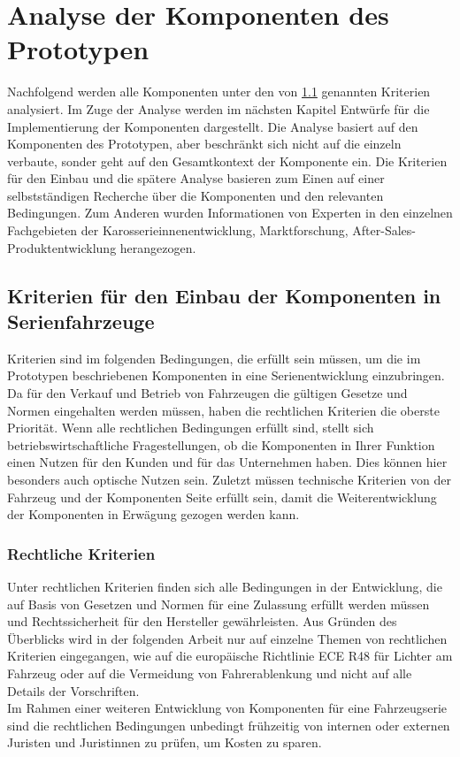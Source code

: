 \chapter{Analyse der Komponenten des Prototypen}
\label{cha:Analyse}
Nachfolgend werden alle Komponenten unter den von \ref{cha:Kriterien} genannten Kriterien analysiert. Im Zuge der Analyse werden im nächsten Kapitel Entwürfe für die Implementierung der Komponenten dargestellt. Die Analyse basiert auf den Komponenten des Prototypen, aber beschränkt sich nicht auf die einzeln verbaute, sonder geht auf den Gesamtkontext der Komponente ein.
Die Kriterien für den Einbau und die spätere Analyse basieren zum Einen auf einer selbstständigen Recherche über die Komponenten und den relevanten Bedingungen. Zum Anderen wurden Informationen von Experten in den einzelnen Fachgebieten der Karosserieinnenentwicklung, Marktforschung, After-Sales-Produktentwicklung herangezogen.
\section{Kriterien für den Einbau der Komponenten in Serienfahrzeuge}
\label{cha:Kriterien}
Kriterien sind im folgenden Bedingungen, die erfüllt sein müssen, um die im Prototypen beschriebenen Komponenten in eine Serienentwicklung einzubringen.\\
Da für den Verkauf und Betrieb von Fahrzeugen die gültigen Gesetze und Normen eingehalten werden müssen, haben die rechtlichen Kriterien die oberste Priorität. Wenn alle rechtlichen Bedingungen erfüllt sind, stellt sich betriebswirtschaftliche Fragestellungen, ob die Komponenten in Ihrer Funktion einen Nutzen für den Kunden und für das Unternehmen haben. Dies können hier besonders auch optische Nutzen sein. Zuletzt müssen technische Kriterien von der Fahrzeug und der Komponenten Seite erfüllt sein, damit die Weiterentwicklung der Komponenten in Erwägung gezogen werden kann.
\subsection{Rechtliche Kriterien}
Unter rechtlichen Kriterien finden sich alle Bedingungen in der Entwicklung, die auf Basis von Gesetzen und Normen für eine Zulassung erfüllt werden müssen und Rechtssicherheit für den Hersteller gewährleisten. Aus Gründen des Überblicks wird in der folgenden Arbeit nur auf einzelne Themen von rechtlichen Kriterien eingegangen, wie auf die europäische Richtlinie ECE R48 für Lichter am Fahrzeug oder auf die Vermeidung von Fahrerablenkung und nicht auf alle Details der Vorschriften.\\
Im Rahmen einer weiteren Entwicklung von Komponenten für eine Fahrzeugserie sind die rechtlichen Bedingungen unbedingt frühzeitig von internen oder externen Juristen und Juristinnen zu prüfen, um Kosten zu sparen.
